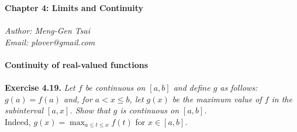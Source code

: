 \documentclass{article}
\begin{document}
\textbf{\Large Chapter 4: Limits and Continuity} \\\\



\emph{Author: Meng-Gen Tsai} \\
\emph{Email: plover@gmail.com} \\\\



\textbf{\large Continuity of real-valued functions} \\\\



\textbf{Exercise 4.19.}
\emph{Let $f$ be continuous on $[a,b]$ and define $g$ as follows:
$g(a) = f(a)$ and, for $a < x \leq b$,
let $g(x)$ be the maximum value of $f$ in the subinterval $[a,x]$.
Show that $g$ is continuous on $[a,b]$.} \\

Indeed, $g(x) = \max_{a \leq t \leq x} f(t)$ for $x \in [a,b]$. \\
\end{document}
